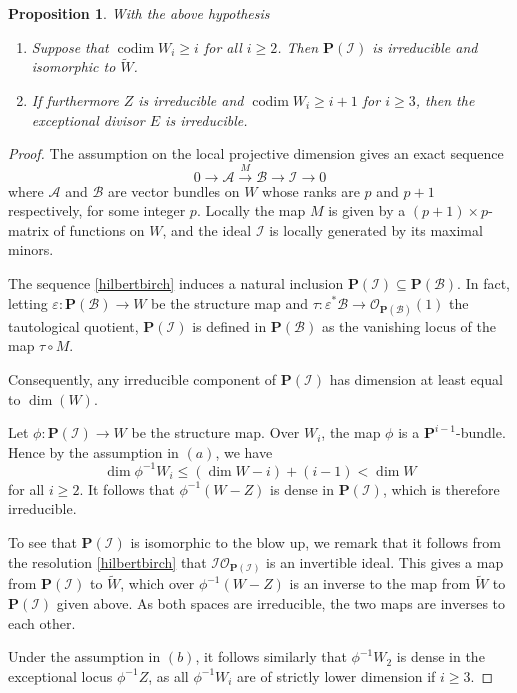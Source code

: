 \documentclass[12pt]{amsart}
\def\til#1{\xrightarrow{#1}}
\let\:=\colon
\def\i{^{-1}}
\def\PP{{\mathbf P}}
\def\A{{\mathcal A}}
\def\I{{\mathcal I}}
\def\OO{{\mathcal O}}
\def\B{{\mathcal B}}
\def\x{\times}
\def\sub{\subseteq}
\def\codim{\operatorname{codim}}
\def\tilde{\widetilde}
\newtheorem{prop}[thm]{Proposition}
\theoremstyle{definition}
\theoremstyle{remark}
\numberwithin{equation}{section}
\begin{document}
 \begin{prop}\label{blowup}
   With the above hypothesis
      \begin{enumerate}
      \item[(a)] Suppose that $\codim W_{i}\ge i$ for all $i\ge2$. Then
        $\PP(\I)$ is irreducible and isomorphic to $\tilde W$.
      \item[(b)] If furthermore $Z$ is irreducible and $\codim
        W_{i}\ge i+1$ for $i\ge3$, then the exceptional divisor $E$ is
        irreducible.
      \end{enumerate}
 \end{prop}

\begin{proof}
The assumption on the local projective dimension gives an exact
sequence
 \begin{equation}\label{hilbertbirch}
         0\to \A \til{M} \B \to \I \to 0
 \end{equation}
 where $\A$ and $\B$ are vector bundles on $W$ whose ranks
 are $p$ and $p+1$ respectively, for some integer $p$.
 Locally the map $M$ is given
 by a $(p+1)\x p$-matrix of functions on $W$, and the
 ideal $\I$ is locally generated by its maximal minors.

 The sequence \eqref{hilbertbirch} induces a natural inclusion
 $\PP(\I)\sub\PP(\B)$.  In fact, letting $\varepsilon\:\PP(\B)\to W$ be
 the structure map and $\tau\:\varepsilon^{*}\B\to\OO_{\PP(\B)}(1)$
 the tautological quotient, $\PP(\I) $ is defined in
 $\PP(\B)$ as the vanishing locus of the map $\tau\circ M$.

 Consequently, any irreducible component of $\PP(\I)$ has dimension at
 least equal to $\dim( W)$.

 Let $\phi\:\PP(\I)\to W$ be the structure map.  Over $W_i$, the map
 $\phi$ is a $\PP^{i-1}$-bundle.  Hence by the assumption in $(a)$, we
 have
 \[ \dim \phi\i W_i \le (\dim W - i) + (i-1) < \dim W
 \]
 for all
 $i\ge 2$.  It follows that $\phi\i(W-Z)$ is dense in $\PP(\I)$,
 which is therefore irreducible.

 To see that $\PP(\I)$ is isomorphic to the blow up, we remark that it
 follows from the resolution \eqref{hilbertbirch} that
 $\I\OO_{\PP(\I)}$ is an invertible ideal.  This gives a map from
 $\PP(\I)$ to $\tilde W$, which over $\phi\i(W-Z)$ is an inverse to
 the map from $\tilde W$ to $\PP(\I)$ given above.  As both spaces are
 irreducible, the two maps are inverses to each other.

 Under the assumption in $(b)$, it follows similarly that $\phi\i
 W_2$ is dense in the exceptional locus $\phi\i Z$, as all $\phi\i W_i$
 are of strictly lower dimension if $i\ge 3$.
\end{proof}
\end{document}
